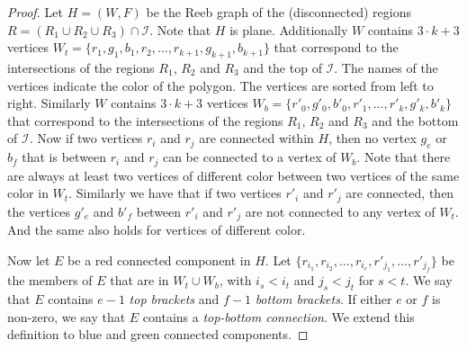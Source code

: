 \documentclass[a4paper,UKenglish,cleveref]{lipics-v2019}
\newcommand{\mremark}[3]{\textcolor{blue}{\textsc{#1 #2:}} \textcolor{SeaGreen}{\textsf{#3}}}
\newcommand{\jerome}[2][says]{\mremark{J\'er\^ome}{#1}{#2}}
\newcommand{\todo}[2][DO]{\mremark{TO}{#1}{#2}}
\newcommand{\draw}{\todo{draw}}
\newcommand{\ixi}{\mathcal{I}}
\begin{document}
\begin{proof}



Let $H=(W, F)$ be the Reeb graph of the (disconnected) regions $R=(R_1\cup R_2\cup R_3)\cap \ixi$.
Note that $H$ is plane. Additionally $W$ contains $3\cdot k + 3$ vertices $W_t=\{r_1, g_1, b_1, r_2,\dots, r_{k+1}, g_{k+1}, b_{k+1}\}$ that correspond to the intersections of the regions $R_1$, $R_2$ and $R_3$ and the top of $\ixi$. The names of the vertices indicate the color of the polygon. The vertices are sorted from left to right.
Similarly $W$ contains $3\cdot k + 3$ vertices $W_b=\textbf{}\{r'_0, g'_0, b'_0, r'_1,\dots, r'_k, g'_k, b'_k\}$ that correspond to the intersections of the regions $R_1$, $R_2$ and $R_3$ and the bottom of $\ixi$.
Now if two vertices $r_i$ and $r_j$ are connected within $H$, then no vertex $g_e$ or $b_f$ that is between $r_i$ and $r_j$ can be connected to a vertex of $W_b$. Note that there are always at least two vertices of different color between two vertices of the same color in $W_t$.
Similarly we have that if two vertices $r'_i$ and $r'_j$ are connected, then the vertices $g'_e$ and $b'_f$ between $r'_i$ and $r'_j$ are not connected to any vertex of $W_t$.
And the same also holds for vertices of different color.

Now let $E$ be a red connected component in $H$. Let $\{r_{i_1}, r_{i_2}, \dots, r_{i_e}, r'_{j_1}, \dots, r'_{j_f}\}$ be the members of $E$ that are in $W_t\cup W_b$, with $i_s<i_t$ and $j_s<j_t$ for $s<t$. We say that $E$ contains $e-1$ \emph{top brackets} and $f-1$ \emph{bottom brackets}. If either $e$ or $f$ is non-zero, we say that $E$ contains a \emph{top-bottom connection}. We extend this definition to blue and green connected components.


\end{proof}
\end{document}
